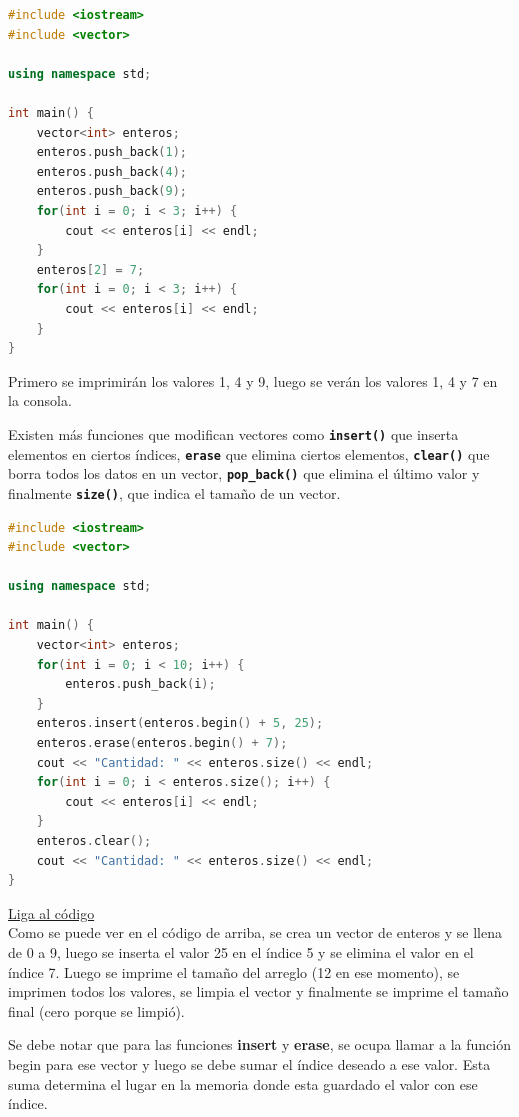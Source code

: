 \documentclass{article}
\begin{document}
\begin{lstlisting}[language=C++, caption=Modificando valores]
#include <iostream>
#include <vector>

using namespace std;

int main() {
    vector<int> enteros;
    enteros.push_back(1);
    enteros.push_back(4);
    enteros.push_back(9);
    for(int i = 0; i < 3; i++) {
        cout << enteros[i] << endl;
    }
    enteros[2] = 7;
    for(int i = 0; i < 3; i++) {
        cout << enteros[i] << endl;
    }
}
\end{lstlisting}

Primero se imprimirán los valores 1, 4 y 9, luego se verán los valores 1, 4 y 7 en la consola.

Existen más funciones que modifican vectores como \textbf{\lstinline{insert()}} que inserta elementos en ciertos índices, \textbf{\lstinline{erase}} que elimina ciertos elementos, \textbf{\lstinline{clear()}} que borra todos los datos en un vector, \textbf{\lstinline{pop_back()}} que elimina el último valor y finalmente \textbf{\lstinline{size()}}, que indica el tamaño de un vector.

\begin{lstlisting}[language=C++, caption=Jugando con vectores]
#include <iostream>
#include <vector>

using namespace std;

int main() {
    vector<int> enteros;
    for(int i = 0; i < 10; i++) {
        enteros.push_back(i);
    }
    enteros.insert(enteros.begin() + 5, 25);
    enteros.erase(enteros.begin() + 7);
    cout << "Cantidad: " << enteros.size() << endl;
    for(int i = 0; i < enteros.size(); i++) {
        cout << enteros[i] << endl;
    }
    enteros.clear();
    cout << "Cantidad: " << enteros.size() << endl;
}
\end{lstlisting}
\href{https://repl.it/@Jamesscn/Juego-de-Vectores}{Liga al código}\\

Como se puede ver en el código de arriba, se crea un vector de enteros y se llena de 0 a 9, luego se inserta el valor 25 en el índice 5 y se elimina el valor en el índice 7. Luego se imprime el tamaño del arreglo (12 en ese momento), se imprimen todos los valores, se limpia el vector y finalmente se imprime el tamaño final (cero porque se limpió).

Se debe notar que para las funciones \textbf{insert} y \textbf{erase}, se ocupa llamar a la función begin para ese vector y luego se debe sumar el índice deseado a ese valor. Esta suma determina el lugar en la memoria donde esta guardado el valor con ese índice.
\end{document}
